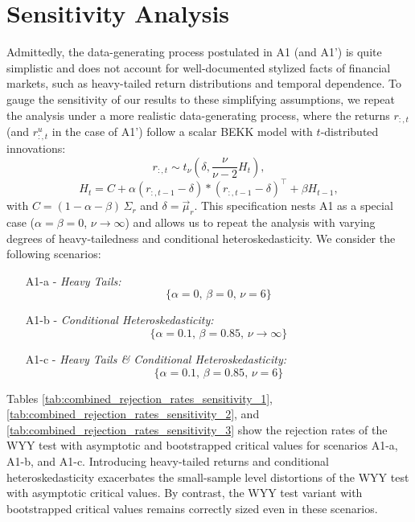 \documentclass[3p,times,twocolumn]{elsarticle}
\begin{document}
\section{Sensitivity Analysis}\label{appendix:sensitivity_analysis}

Admittedly, the data-generating process postulated in A1 (and A1') is quite simplistic and does not account for well-documented stylized facts of financial markets, such as heavy-tailed return distributions and temporal dependence.
To gauge the sensitivity of our results to these simplifying assumptions, we repeat the analysis under a more realistic data-generating process, where the returns $r_{:,t}$ (and $r_{:,t}^{u}$ in the case of A1') follow a scalar BEKK model \citep{engleMultivariateSimultaneousGeneralized1995} with $t$-distributed innovations:
\begin{equation}
    r_{:,t} \sim t_{\nu}\left(\delta, \dfrac{\nu}{\nu-2} H_{t}\right),
\end{equation}
\begin{equation}
    H_{t} = C + \alpha (r_{:,t-1}-\delta)*(r_{:,t-1}-\delta)^{\top}+\beta H_{t-1},
\end{equation}
with $C=(1-\alpha-\beta)\,\Sigma_{r}$ and $\delta = \vec{\mu}_{r}$. 
This specification nests A1 as a special case ($\alpha=\beta=0$, $\nu\to\infty$) and allows us to repeat the analysis with varying degrees of heavy-tailedness and conditional heteroskedasticity. 
We consider the following scenarios:
\begin{itemize}
    \item[A1-a] - \emph{Heavy Tails:}
    \begin{equation}
        \{\alpha = 0, \, \beta = 0, \, \nu = 6\}
    \end{equation}
    \item[A1-b] - \emph{Conditional Heteroskedasticity:}
    \begin{equation}
        \{\alpha = 0.1, \, \beta = 0.85, \, \nu \to \infty\}
    \end{equation}
    \item[A1-c] - \emph{Heavy Tails \& Conditional Heteroskedasticity:}
    \begin{equation}
        \{\alpha = 0.1, \, \beta = 0.85, \, \nu = 6\}
    \end{equation}
\end{itemize}

Tables \ref{tab:combined_rejection_rates_sensitivity_1}, \ref{tab:combined_rejection_rates_sensitivity_2}, and \ref{tab:combined_rejection_rates_sensitivity_3} show the rejection rates of the WYY test with asymptotic and bootstrapped critical values for scenarios A1-a, A1-b, and A1-c. 
Introducing heavy-tailed returns and conditional heteroskedasticity exacerbates the small-sample level distortions of the WYY test with asymptotic critical values. 
By contrast, the WYY test variant with bootstrapped critical values remains correctly sized even in these scenarios.
\end{document}

